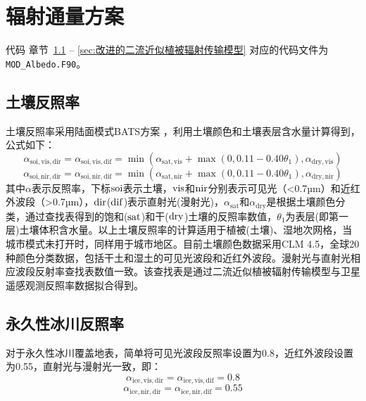 \chapter{辐射通量方案}

\begin{mymdframed}{代码}
  章节~\ref{sec:土壤反照率} -- \ref{sec:改进的二流近似植被辐射传输模型} 对应的代码文件为\texttt{MOD\_Albedo.F90}。
\end{mymdframed}


\section{土壤反照率}\label{sec:土壤反照率}
土壤反照率采用陆面模式BATS方案 \citep{dickinson1986biosphere,dickinson1993biosphere}，利用土壤颜色和土壤表层含水量计算得到，公式如下：
\begin{equation}\label{eq:soil_albedo1}
  \alpha_{\mathrm{soi,vis,dir}}=\alpha_{\mathrm{soi,vis,dif}}=\min\left(\alpha_{\mathrm{sat, vis}}+\max\left(0,0.11-0.40 \theta_1\right), \alpha_{\mathrm{dry, vis}}\right)
\end{equation}
%
\begin{equation}
  \alpha_{\mathrm{soi,nir,dir}}=\alpha_{\mathrm{soi,nir,dif}}=\min\left(\alpha_{\mathrm{sat, nir}}+\max\left(0,0.11-0.40 \theta_1\right), \alpha_{\mathrm{dry, nir}}\right)
\end{equation}
其中$\alpha$表示反照率，下标$\rm soi$表示土壤，$\rm vis$和$\rm nir$分别表示可见光（<0.7µm）和近红外波段（>0.7µm），$\rm dir$($\rm dif$)表示直射光(漫射光)，$\alpha_{\mathrm{sat}}$和$\alpha_{\mathrm{dry}}$是根据土壤颜色分类，通过查找表得到的饱和($\rm sat$)和干($\rm dry$)土壤的反照率数值，$\theta_1$为表层(即第一层)土壤体积含水量。以上土壤反照率的计算适用于植被(土壤)、湿地次网格，当城市模式未打开时，同样用于城市地区。目前土壤颜色数据采用CLM 4.5，全球20种颜色分类数据，包括干土和湿土的可见光波段和近红外波段。漫射光与直射光相应波段反射率查找表数值一致。该查找表是\citet{lawrence2007representing}通过二流近似植被辐射传输模型与卫星遥感观测反照率数据拟合得到。


\section{永久性冰川反照率}\label{sec:永久性冰川反照率}
对于永久性冰川覆盖地表，简单将可见光波段反照率设置为0.8，近红外波段设置为0.55，直射光与漫射光一致，即：
\begin{equation}
  \alpha_{\mathrm{ice,vis,dir}}=\alpha_{\mathrm{ice,vis,dif}}=0.8
\end{equation}
%
\begin{equation}
  \alpha_{\mathrm{ice,nir,dir}}=\alpha_{\mathrm{ice,nir,dif}}=0.55
\end{equation}

